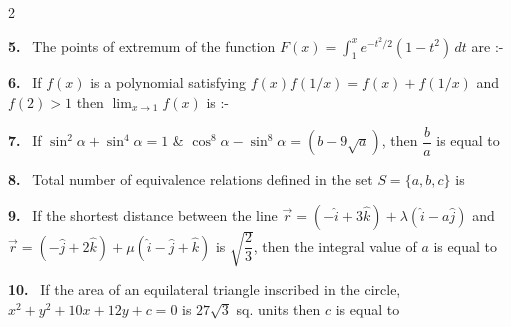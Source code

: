 \documentclass[10pt]{extarticle}
\newcommand{\qn}[1]{\par\smallskip\noindent\textbf{#1.}~}
\begin{document}
\begin{multicols}{2}
\qn{5} The points of extremum of the function $F(x)=\displaystyle\int_1^{x}e^{-t^2/2}(1-t^2)\,dt$ are :-

\qn{6} If $f(x)$ is a polynomial satisfying $f(x)f(1/x)=f(x)+f(1/x)$ and $f(2)>1$ then $\displaystyle\lim_{x\to1}f(x)$ is :-

\qn{7} If $\sin^2\alpha+\sin^4\alpha=1$ \& $\cos^8\alpha-\sin^8\alpha=\left(b-9\sqrt a\right)$, then $\dfrac ba$ is equal to

\qn{8} Total number of equivalence relations defined in the set $S=\{a,b,c\}$ is

\qn{9} If the shortest distance between the line $\vec r=\left(-\hat i+3\hat k\right)+\lambda\left(\hat i-a\hat j\right)$ and $\vec r=\left(-\hat j+2\hat k\right)+\mu\left(\hat i-\hat j+\hat k\right)$ is $\sqrt{\dfrac23}$, then the integral value of $a$ is equal to

\qn{10} If the area of an equilateral triangle inscribed in the circle, $x^2+y^2+10x+12y+c=0$ is $27\sqrt3$ sq. units then $c$ is equal to
\end{multicols}
\end{document}
